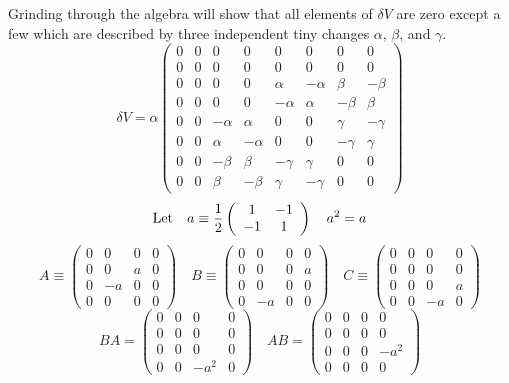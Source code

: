 \documentclass[12pt]{article}
\begin{document}
 Grinding through the algebra will show that all
elements of $\delta V$ are zero except a few which are described by
three independent tiny changes $\alpha$, $\beta$, and $\gamma$.
\begin{equation}
\delta V = \alpha \left(
\begin{array}{cccccccc}
 0 &  0 &  0 &  0 &  0 &  0 &  0 &  0 \\
 0 &  0 &  0 &  0 &  0 &  0 &  0 &  0 \\
 0 &  0 &  0 &  0 &  \alpha &  -\alpha &  \beta &  -\beta \\
 0 &  0 &  0 &  0 &  -\alpha &  \alpha &  -\beta &  \beta \\
 0 &  0 &  -\alpha &  \alpha & 0 & 0 &  \gamma &  -\gamma \\
 0 &  0 &  \alpha & -\alpha & 0 &  0 &  -\gamma &  \gamma \\
 0 &  0 &  -\beta &  \beta &  -\gamma &  \gamma &  0 &  0 \\
 0 &  0 &  \beta &  -\beta &  \gamma &  -\gamma &  0 &  0
\end{array}
\right)
\end{equation}
$$ {\rm Let}\quad a \equiv {1 \over 2}
\left( \begin{array}{cc} 1 & -1 \\ -1 & 1 \end{array} \right) \quad
a^2 = a$$
$$ A \equiv \left( \begin{array}{cccc} 0 & 0 & 0 & 0 \\ 0 & 0 & a & 0 \\
0 & -a & 0 & 0 \\ 0 & 0 & 0 & 0 \end{array} \right) \quad
B \equiv \left( \begin{array}{cccc} 0 & 0 & 0 & 0 \\ 0 & 0 & 0 & a \\
0 & 0 & 0 & 0 \\ 0 & -a & 0 & 0 \end{array} \right) \quad
C \equiv \left( \begin{array}{cccc} 0 & 0 & 0 & 0 \\ 0 & 0 & 0 & 0 \\
0 & 0 & 0 & a \\ 0 & 0 & -a & 0 \end{array} \right)$$
$$BA = \left( \begin{array}{cccc} 0 & 0 & 0 & 0 \\ 0 & 0 & 0 & 0 \\
0 & 0 & 0 & 0 \\ 0 & 0 & -a^2 & 0 \end{array} \right) \quad
AB = \left( \begin{array}{cccc} 0 & 0 & 0 & 0 \\ 0 & 0 & 0 & 0 \\
0 & 0 & 0 & -a^2 \\ 0 & 0 & 0 & 0 \end{array} \right) $$
\end{document}
